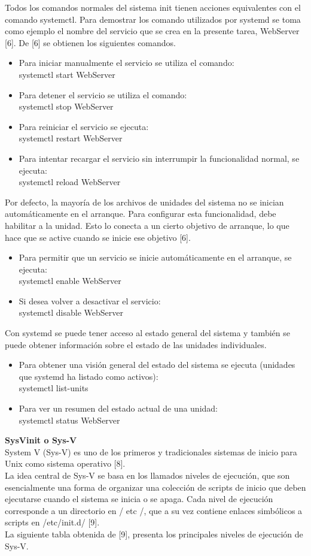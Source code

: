 \documentclass[conference]{IEEEtran}
\begin{document}
Todos los comandos normales del sistema init tienen acciones equivalentes con el comando systemctl. Para demostrar los comando utilizados por systemd se toma como ejemplo el nombre del servicio que se crea en la presente tarea, WebServer [6]. De [6] se obtienen los siguientes comandos.
\begin{itemize}
\item Para iniciar manualmente el servicio se utiliza el comando:
\\systemctl start WebServer
\item Para detener el servicio se utiliza el comando:
\\systemctl stop WebServer
\item Para reiniciar el servicio se ejecuta:
\\systemctl restart WebServer
\item Para intentar recargar el servicio sin interrumpir la funcionalidad normal, se ejecuta:
\\systemctl reload WebServer
\end{itemize}
Por defecto, la mayoría de los archivos de unidades del sistema no se inician automáticamente en el arranque. Para configurar esta funcionalidad, debe habilitar a la unidad. Esto lo conecta a un cierto objetivo de arranque, lo que hace que se active cuando se inicie ese objetivo [6].
\begin{itemize}
\item Para permitir que un servicio se inicie automáticamente en el arranque, se ejecuta:
\\systemctl enable WebServer
\item Si desea volver a desactivar el servicio:
\\systemctl disable WebServer
\end{itemize}
Con systemd se puede tener acceso al estado general del sistema y también se puede obtener información sobre el estado de las unidades individuales.
\begin{itemize}
\item Para obtener una visión general del estado del sistema se ejecuta (unidades que systemd ha listado como activos):
\\systemctl list-units
\item Para ver un resumen del estado actual de una unidad:
\\systemctl status WebServer

\end{itemize}
\textbf{SysVinit o Sys-V}
\\System V (Sys-V) es uno de los primeros y tradicionales sistemas de inicio para Unix como sistema operativo [8].
\\La idea central de Sys-V se basa en los llamados niveles de ejecución, que son esencialmente una forma de organizar una colección de scripts de inicio que deben ejecutarse cuando el sistema se inicia o se apaga. Cada nivel de ejecución corresponde a un directorio en / etc /, que a su vez contiene enlaces simbólicos a scripts en /etc/init.d/ [9].
\\La siguiente tabla obtenida de [9], presenta los principales niveles de ejecución de Sys-V.
\end{document}
